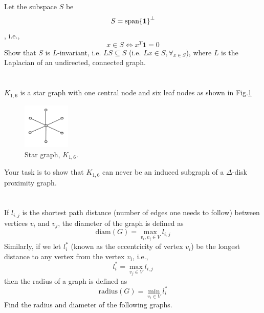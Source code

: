 \documentclass[]{article}
\numberwithin{equation}{section}
\renewcommand{\figurename}{Fig.}
\newcommand{\diam}{\text{diam}}
\newcommand{\radius}{\text{radius}}
\begin{document}
\section{}
Let the subspace $S$ be\[
	S = \text{span}\qty{\mathbf{1}}^{\perp}
\], i.e.,\[
	x \in S \iff x^T \mathbf{1} = 0
\]
Show that $S$ is $L$-invariant, i.e. $LS \subseteq S$ (i.e. $L x \in S, \forall_{x\in S}$), where $L$ is the Laplacian of an undirected, connected graph.














\section{}
$K_{1,6}$ is a star graph with one central node and six leaf nodes as shown in \figurename\ref{fig:pblm5}

\begin{figure}[h]
	\centering
	\includegraphics[width=0.2\textwidth]{figs/pblm5.png}
	\caption{Star graph, $K_{1,6}$.}
	\label{fig:pblm5}
\end{figure}

Your task is to show that $K_{1,6}$ can never be an induced subgraph of a $\Delta$-disk proximity graph.










\section{}
If $l_{i,j}$ is the shortest path distance (number of edges one needs to follow) between vertices $v_i$ and $v_j$, 
the diameter of the graph is defined as\[
	\diam(G) = \max_{v_i,v_j \in V} l_{i,j}
\] Similarly, if we let $l_{i}^{*}$ (known as the eccentricity of vertex $v_i$) be the longest distance to any vertex from the vertex $v_i$, i.e.,\[
	l_{i}^{*} = \max_{v_j \in V} l_{i,j}
\] then the radius of a graph is defined as\[
	\radius(G) = \min_{v_i \in V} l_{i}^{*}
\] Find the radius and diameter of the following graphs.
\end{document}
